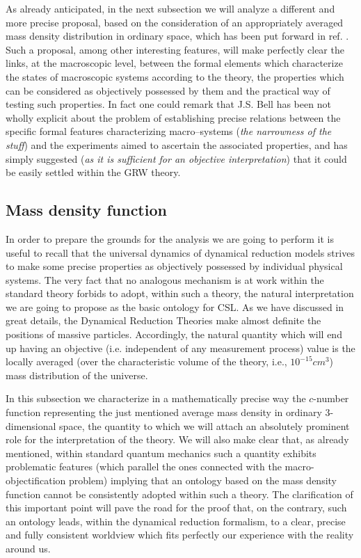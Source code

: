 \documentclass[12pt]{article}
\begin{document}
As already anticipated, in
the next subsection we will analyze a different and more precise
proposal, based on the consideration of an appropriately averaged
mass density distribution in ordinary space, which has been put
forward in ref. \cite{cc}. Such a proposal, among other interesting
features, will make perfectly clear the links, at the macroscopic
level, between the formal elements which characterize the states of
macroscopic systems according to the theory, the properties which
can be considered as objectively possessed by them and the
practical way of testing such properties. In fact one could remark
that J.S. Bell has been not wholly explicit about the problem of
establishing precise relations between the specific formal features
characterizing macro--systems (\textit{the narrowness of the stuff}) and
the experiments aimed to ascertain the associated properties, and has
simply suggested (\textit{as it is sufficient for an objective
interpretation}) that it could be easily settled within the GRW theory.


\subsection{Mass density function} \label{sec122}

In order to prepare the grounds for the analysis we are going to
perform it is useful to recall that the universal dynamics of
dynamical reduction models strives to make some precise properties
as objectively possessed by individual physical systems. The very
fact that no analogous mechanism is at work within the standard
theory forbids to adopt, within such a theory, the natural
interpretation we are going to propose as the basic ontology for
CSL. As we have discussed in great details, the Dynamical
Reduction Theories make almost definite the positions of massive
particles. Accordingly, the natural quantity which will end up
having an objective (i.e. independent of any measurement process)
value is the
 locally averaged (over the characteristic volume of the
theory, i.e., $10^{-15} cm^{3}$) mass distribution of the universe.

In this subsection we characterize in a mathematically precise way
the $c$-number function representing the just mentioned average
mass density in ordinary 3-dimensional space, the quantity to
which we will attach an absolutely prominent role for the
interpretation of the theory. We will also make clear that, as
already mentioned, within standard quantum mechanics such a
quantity exhibits problematic features (which parallel the ones
connected with the macro-objectification problem) implying that
an ontology based on the mass density function cannot be
consistently adopted within such a theory. The clarification of
this important point will pave the road for the proof that, on the
contrary, such an ontology leads, within the dynamical reduction
formalism, to a clear, precise and fully consistent worldview
which fits perfectly our experience with the reality around us.
\end{document}
